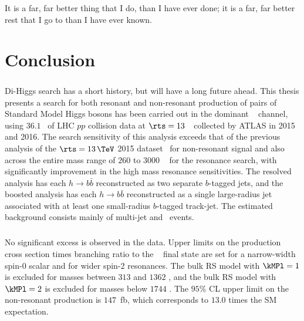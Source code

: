 \begin{savequote}[75mm]
It is a far, far better thing that I do, than I have ever done; it is a far, far better rest that I go to than I have ever known.
\end{savequote}

\chapter{Conclusion}
\label{conclusion}


\paragraph{}
Di-Higgs search has a short history, but will have a long future ahead. 
This thesis presents a search for both resonant and non-resonant production of pairs of Standard Model Higgs bosons has been carried out in the dominant \bbbb~ channel, using $36.1$ \ifb\ of LHC $pp$ collision data at $\rts = 13$~\TeV\ collected by ATLAS in 2015 and 2016. 
The search sensitivity of this analysis exceeds that of the previous analysis of the $\rts = 13\,\TeV$ 2015 dataset~\cite{Aaboud:2016xco} for non-resonant signal and also across the entire mass range of $260$ to $3000$ \GeV~ for the resonance search, with significantly improvement in the high mass resonance sensitivities. 
The resolved analysis has each $h \to b\bar{b}$ reconstructed as two separate $b$-tagged jets, and the boosted analysis has each $h \to b\bar{b}$ reconstructed as a single large-radius jet associated with at least one small-radius $b$-tagged track-jet. 
The estimated background consists mainly of multi-jet and \ttbar\ events.

\paragraph{}
No significant excess is observed in the data. 
Upper limits on the production cross section times branching ratio to the \bbbb~ final state are set for a narrow-width spin-0 scalar and for wider spin-2 resonances. 
The bulk RS model with $\kMPl = 1$ is excluded for masses between $313$ and $1362$ \GeV, and the bulk RS model with $\kMPl = 2$ is excluded for masses below $1744$ \GeV.
The $95\%$ CL upper limit on the non-resonant production is $147$~fb, which corresponds to $13.0$ times the SM expectation.

